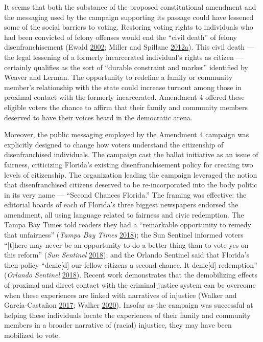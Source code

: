 \documentclass[
  12pt,
]{article}
\begin{document}
It seems that both the substance of the proposed constitutional amendment and the messaging used by the campaign supporting its passage could have lessened some of the social barriers to voting. Restoring voting rights to individuals who had been convicted of felony offenses would end the ``civil death'' of felony disenfranchisement (Ewald \protect\hyperlink{ref-Ewald2002}{2002}; Miller and Spillane \protect\hyperlink{ref-Miller2012}{2012}\protect\hyperlink{ref-Miller2012}{a}). This civil death --- the legal lessening of a formerly incarcerated individual's rights as citizen --- certainly qualifies as the sort of ``durable constraint and marker'' identified by Weaver and Lerman. The opportunity to redefine a family or community member's relationship with the state could increase turnout among those in proximal contact with the formerly incarcerated. Amendment 4 offered these eligible voters the chance to affirm that their family and community members deserved to have their voices heard in the democratic arena.

Moreover, the public messaging employed by the Amendment 4 campaign was explicitly designed to change how voters understand the citizenship of disenfranchised individuals. The campaign cast the ballot initiative as an issue of fairness, criticizing Florida's existing disenfranchisement policy for creating two levels of citizenship. The organization leading the campaign leveraged the notion that disenfranchised citizens deserved to be re-incorporated into the body politic in its very name --- ``Second Chances Florida.'' The framing was effective: the editorial boards of each of Florida's three biggest newspapers endorsed the amendment, all using language related to fairness and civic redemption. The Tampa Bay Times told readers they had a ``remarkable opportunity to remedy that unfairness'' (\emph{Tampa Bay Times} \protect\hyperlink{ref-tampabaytimes2018}{2018}); the Sun Sentinel informed voters ``{[}t{]}here may never be an opportunity to do a better thing than to vote yes on this reform'' (\emph{Sun Sentinel} \protect\hyperlink{ref-SunSentinelEditorial2018}{2018}); and the Orlando Sentinel said that Florida's then-policy ``denie{[}d{]} our fellow citizens a second chance. It denie{[}d{]} redemption'' (\emph{Orlando Sentinel} \protect\hyperlink{ref-ORLANDOSENTINEL2018}{2018}). Recent work demonstrates that the demobilizing effects of proximal and direct contact with the criminal justice system can be overcome when these experiences are linked with narratives of injustice (Walker and García-Castañon \protect\hyperlink{ref-Walker2017}{2017}; Walker \protect\hyperlink{ref-Walker2020}{2020}). Insofar as the campaign was successful at helping these individuals locate the experiences of their family and community members in a broader narrative of (racial) injustice, they may have been mobilized to vote.
\end{document}
